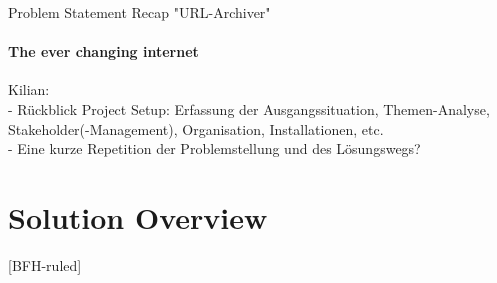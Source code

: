 \documentclass[
    ngerman,%
    authorontitle=true,
]{bfhbeamer}
\begin{document}
    \begin{frame}{Problem Statement Recap "URL-Archiver"}
    	\framesubtitle{The ever changing internet}
    	Kilian: \\
    	- Rückblick Project Setup: Erfassung der Ausgangssituation, Themen-Analyse, Stakeholder(-Management), Organisation, Installationen, etc.\\
    	- Eine kurze Repetition der Problemstellung und des Lösungswegs?
    \end{frame}

	\section{Solution Overview}
	[BFH-ruled]
	\frame{\sectionpage}
	
\end{document}
